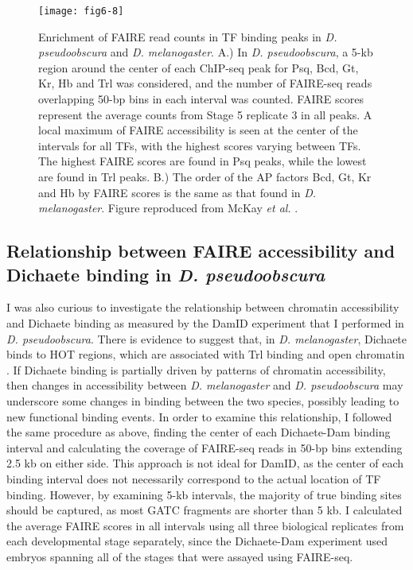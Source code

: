 \begin{figure}
\centering
\texttt{[image: fig6-8]}
\caption{Enrichment of FAIRE read counts in TF binding peaks in \emph{D. pseudoobscura} and \emph{D. melanogaster}. A.) In \emph{D. pseudoobscura}, a 5-kb region around the center of each ChIP-seq peak for Psq, Bcd, Gt, Kr, Hb and Trl was considered, and the number of FAIRE-seq reads overlapping 50-bp bins in each interval was counted. FAIRE scores represent the average counts from Stage 5 replicate 3 in all peaks. A local maximum of FAIRE accessibility is seen at the center of the intervals for all TFs, with the highest scores varying between TFs. The highest FAIRE scores are found in Psq peaks, while the lowest are found in Trl peaks. B.) The order of the AP factors Bcd, Gt, Kr and Hb by FAIRE scores is the same as that found in \emph{D. melanogaster}. Figure reproduced from McKay \emph{et al.} \citet{mckay_common_2013}.}
\label{Figure 6.8}
\end{figure}

\subsection{Relationship between FAIRE accessibility and Dichaete binding in \emph{D. pseudoobscura}}
I was also curious to investigate the relationship between chromatin accessibility and Dichaete binding as measured by the DamID experiment that I performed in \emph{D. pseudoobscura}. There is evidence to suggest that, in \emph{D. melanogaster}, Dichaete binds to HOT regions, which are associated with Trl binding and open chromatin \citep{aleksic_role_2013,kvon_hot_2012}. If Dichaete binding is partially driven by patterns of chromatin accessibility, then changes in accessibility between \emph{D. melanogaster} and \emph{D. pseudoobscura} may underscore some changes in binding between the two species, possibly leading to new functional binding events. In order to examine this relationship, I followed the same procedure as above, finding the center of each Dichaete-Dam binding interval and calculating the coverage of FAIRE-seq reads in 50-bp bins extending 2.5 kb on either side. This approach is not ideal for DamID, as the center of each binding interval does not necessarily correspond to the actual location of TF binding. However, by examining 5-kb intervals, the majority of true binding sites should be captured, as most GATC fragments are shorter than 5 kb. I calculated the average FAIRE scores in all intervals using all three biological replicates from each developmental stage separately, since the Dichaete-Dam experiment used embryos spanning all of the stages that were assayed using FAIRE-seq.\\

